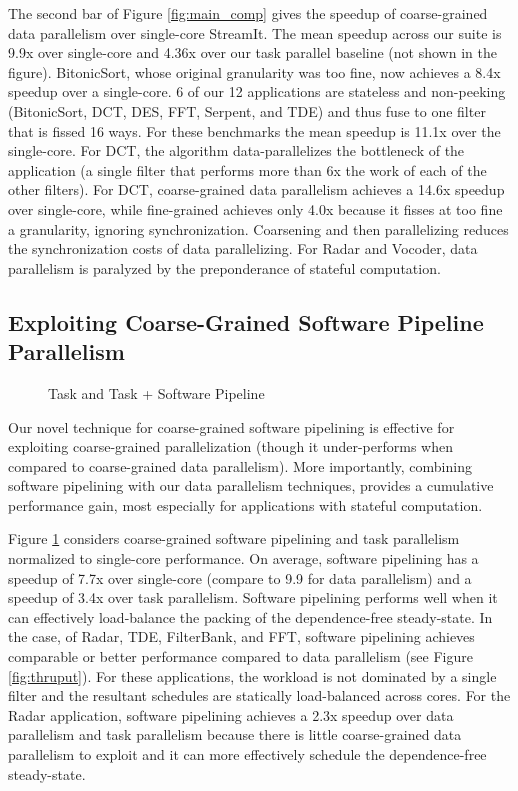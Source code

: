 The second bar of Figure \ref{fig:main_comp} gives the speedup of
coarse-grained data parallelism over single-core StreamIt. The mean
speedup across our suite is 9.9x over single-core and 4.36x over our
task parallel baseline (not shown in the figure).  BitonicSort, whose
original granularity was too fine, now achieves a 8.4x speedup over a
single-core. 6 of our 12 applications are stateless and non-peeking
(BitonicSort, DCT, DES, FFT, Serpent, and TDE) and thus fuse to one
filter that is fissed 16 ways.  For these benchmarks the mean speedup
is 11.1x over the single-core.  For DCT, the algorithm
data-parallelizes the bottleneck of the application (a single filter
that performs more than 6x the work of each of the other filters).
For DCT, coarse-grained data parallelism achieves a 14.6x speedup over
single-core, while fine-grained achieves only 4.0x because it fisses
at too fine a granularity, ignoring synchronization.
Coarsening and then parallelizing reduces the synchronization costs of
data parallelizing.  For Radar and Vocoder, data parallelism is
paralyzed by the preponderance of stateful computation.

\subsection{Exploiting Coarse-Grained Software Pipeline Parallelism}

\begin{figure}[t]
\centering
{}
\caption{Task and Task + Software Pipeline
\protect\label{fig:softpipe_graph}}
\end{figure}
Our novel technique for coarse-grained software pipelining is
effective for exploiting coarse-grained parallelization (though it
under-performs when compared to coarse-grained data parallelism).
More importantly, combining software pipelining with our data
parallelism techniques, provides a cumulative performance gain,
most especially for applications with stateful computation.

Figure \ref{fig:softpipe_graph} considers coarse-grained software
pipelining and task parallelism normalized to single-core performance.
On average, software pipelining has a speedup of 7.7x over single-core
(compare to 9.9 for data parallelism) and a speedup of 3.4x over task
parallelism. Software pipelining performs well when it can effectively
load-balance the packing of the dependence-free steady-state.  In the
case, of Radar, TDE, FilterBank, and FFT, software pipelining achieves
comparable or better performance compared to data parallelism (see
Figure \ref{fig:thruput}).  For these applications, the workload is
not dominated by a single filter and the resultant schedules are
statically load-balanced across cores.  For the Radar application,
software pipelining achieves a 2.3x speedup over data parallelism and
task parallelism because there is little coarse-grained data
parallelism to exploit and it can more effectively schedule the
dependence-free steady-state.


